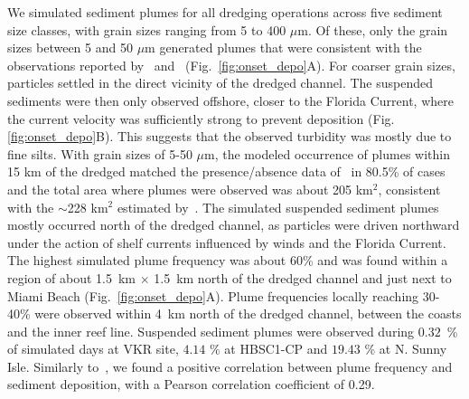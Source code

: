 \documentclass[preprint,12pt,authoryear]{elsarticle}
\begin{document}
We simulated sediment plumes for all dredging operations across five sediment size classes, with grain sizes ranging from 5 to 400 $\mu$m. Of these, only the grain sizes between 5 and 50 $\mu$m generated plumes that were consistent with the observations reported by~\cite{barnes2015sediment} and~\cite{cunning2019extensive} (Fig.~\ref{fig:onset_depo}A). For coarser grain sizes, particles settled in the direct vicinity of the dredged channel. The suspended sediments were then only observed offshore, closer to the Florida Current, where the current velocity was sufficiently strong to prevent deposition (Fig. \ref{fig:onset_depo}B). This suggests that the observed turbidity was mostly due to fine silts. With grain sizes of 5-50 $\mu$m, the modeled occurrence of plumes  within 15 km of the dredged matched the presence/absence data of~\cite{cunning2019extensive} in 80.5\% of cases and the total area where plumes were observed was about 205 km$^2$, consistent with the $\sim$228 km$^2$ estimated by~\cite{barnes2015sediment}. The simulated suspended sediment plumes mostly occurred north of the dredged channel, as particles were driven northward under the action of shelf currents influenced by winds and the Florida Current. The highest simulated plume frequency was about 60\% and was found within a region of about 1.5~km $\times$ 1.5~km north of the dredged channel and just next to Miami Beach (Fig.~\ref{fig:onset_depo}A). Plume frequencies locally reaching 30-40\% were observed within 4~km north of the dredged channel, between the coasts and the inner reef line. Suspended sediment plumes were observed during $0.32$~\% of simulated days at VKR site, $4.14$ \% at HBSC1-CP and $19.43$ \% at N. Sunny Isle. Similarly to~\cite{cunning2019extensive}, we found a positive correlation between plume frequency and sediment deposition, with a Pearson correlation coefficient of 0.29.

\end{document}
